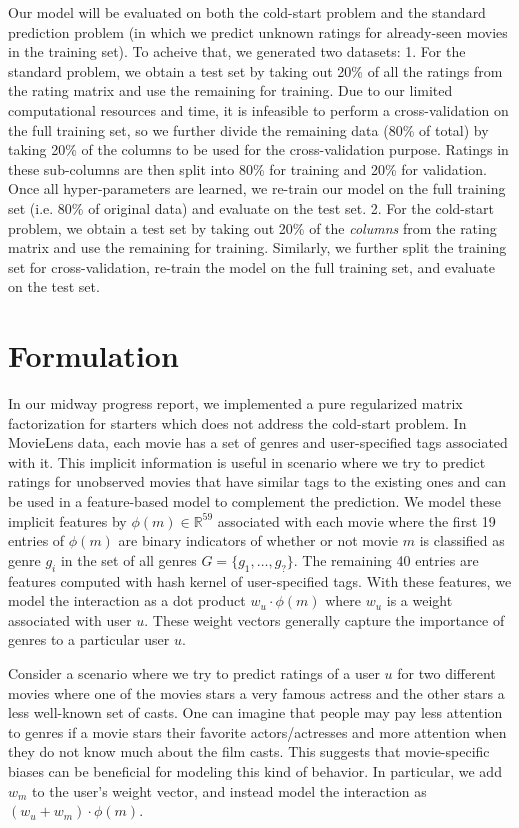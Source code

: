 \documentclass{article} %
\begin{document}
	Our model will be evaluated on both the cold-start problem and the standard prediction problem (in which we predict unknown ratings for already-seen movies in the training set). To acheive that, we generated two datasets: 1. For the standard problem, we obtain a test set by taking out 20\% of all the ratings from the rating matrix and use the remaining for training. Due to our limited computational resources and time, it is infeasible to perform a cross-validation on the full training set, so we further divide the remaining data (80\% of total) by taking 20\% of the columns to be used for the cross-validation purpose. Ratings in these sub-columns are then split into 80\% for training and 20\% for validation. Once all hyper-parameters are learned, we re-train our model on the full training set (i.e. 80\% of original data) and evaluate on the test set. 2. For the cold-start problem, we obtain a test set by taking out 20\% of the {\em columns} from the rating matrix and use the remaining for training. Similarly, we further split the training set for cross-validation, re-train the model on the full training set, and evaluate on the test set.
	\section{Formulation}
	In our midway progress report, we implemented a pure regularized matrix factorization for starters which does not address the cold-start problem. In MovieLens data, each movie has a set of genres and user-specified tags associated with it. This implicit information is useful in scenario where we try to predict ratings for unobserved movies that have similar tags to the existing ones and can be used in a feature-based model to complement the prediction. We model these implicit features by $\phi(m) \in \mathbb{R}^{59}$ associated with each movie where the first 19 entries of $\phi(m)$ are binary indicators of whether or not movie $m$ is classified as genre $g_i$ in the set of all genres $G = \{g_1,\ldots, g_?\}$. The remaining 40 entries are features computed with hash kernel of user-specified tags. With these features, we model the interaction as a dot product $w_u \cdot \phi(m)$ where $w_u$ is a weight associated with user $u$. These weight vectors generally capture the importance of genres to a particular user $u$.
	
	Consider a scenario where we try to predict ratings of a user $u$ for two different movies where one of the movies stars a very famous actress and the other stars a less well-known set of casts. One can imagine that people may pay less attention to genres if a movie stars their favorite actors/actresses and more attention when they do not know much about the film casts. This suggests that movie-specific biases can be beneficial for modeling this kind of behavior. In particular, we add $w_m$ to the user's weight vector, and instead model the interaction as $(w_u + w_m) \cdot \phi(m)$.
	
\end{document}
